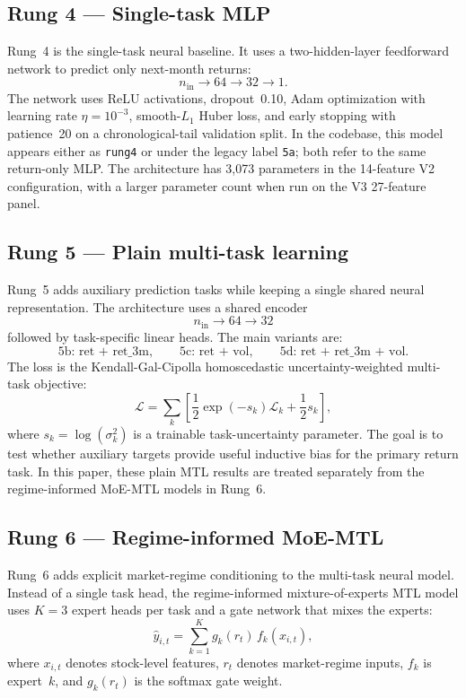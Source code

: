 \documentclass[11pt]{article}
\begin{document}
\subsection{Rung 4 --- Single-task MLP}

Rung~4 is the single-task neural baseline. It uses a two-hidden-layer
feedforward network to predict only next-month returns:
\[
n_{\text{in}} \to 64 \to 32 \to 1.
\]
The network uses ReLU activations, dropout~0.10, Adam optimization with
learning rate $\eta=10^{-3}$, smooth-$L_1$ Huber loss, and early
stopping with patience~20 on a chronological-tail validation split. In
the codebase, this model appears either as \texttt{rung4} or under the
legacy label \texttt{5a}; both refer to the same return-only MLP. The
architecture has 3{,}073 parameters in the 14-feature V2 configuration,
with a larger parameter count when run on the V3 27-feature panel.

\subsection{Rung 5 --- Plain multi-task learning}

Rung~5 adds auxiliary prediction tasks while keeping a single shared
neural representation. The architecture uses a shared encoder
\[
n_{\text{in}} \to 64 \to 32
\]
followed by task-specific linear heads. The main variants are:
\[
\text{5b: ret + ret\_3m}, \qquad
\text{5c: ret + vol}, \qquad
\text{5d: ret + ret\_3m + vol}.
\]
The loss is the Kendall-Gal-Cipolla homoscedastic uncertainty-weighted
multi-task objective:
\[
\mathcal{L}
=
\sum_{k}
\left[
\frac{1}{2}\exp(-s_k)\mathcal{L}_k
+
\frac{1}{2}s_k
\right],
\]
where $s_k=\log(\sigma_k^2)$ is a trainable task-uncertainty parameter.
The goal is to test whether auxiliary targets provide useful inductive
bias for the primary return task. In this paper, these plain MTL results
are treated separately from the regime-informed MoE-MTL models in
Rung~6.

\subsection{Rung 6 --- Regime-informed MoE-MTL}

Rung~6 adds explicit market-regime conditioning to the multi-task neural
model. Instead of a single task head, the regime-informed
mixture-of-experts MTL model uses $K=3$ expert heads per task and a
gate network that mixes the experts:
\[
\hat{y}_{i,t}
=
\sum_{k=1}^{K} g_k(r_t)\, f_k(x_{i,t}),
\]
where $x_{i,t}$ denotes stock-level features, $r_t$ denotes
market-regime inputs, $f_k$ is expert~$k$, and $g_k(r_t)$ is the
softmax gate weight.
\end{document}
